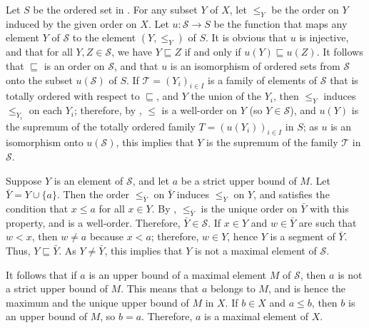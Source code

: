 \documentclass{article}
\begin{document}
\begin{solution}[\ref{exe:51daga9q}]
  \label{sol:5u09m13a}
  Let \(S\) be the ordered set in .  For any subset
  \(Y\) of \(X\), let \(\leq_Y\) be the order on \(Y\) induced by the
  given order on \(X\).  Let \(u : \mathcal{S} \to S\) be the function
  that maps any element \(Y\) of \(\mathcal{S}\) to the element
  \((Y, \leq_Y)\) of \(S\).  It is obvious that \(u\) is injective,
  and that for all \(Y, Z \in \mathcal{S}\), we have
  \(Y \sqsubseteq Z\) if and only if \(u(Y) \sqsubseteq u(Z)\).  It
  follows that \(\sqsubseteq\) is an order on \(\mathcal{S}\), and
  that \(u\) is an isomorphism of ordered sets from \(\mathcal{S}\)
  onto the subset \(u(\mathcal{S})\) of \(S\).  If
  \(\mathcal{T} = (Y_i)_{i \in I}\) is a family of elements of
  \(\mathcal{S}\) that is totally ordered with respect to
  \(\sqsubseteq\), and \(Y\) the union of the \(Y_i\), then \(\leq_Y\)
  induces \(\leq_{Y_i}\) on each \(Y_i\); therefore, by
  , \(\leq\) is a well-order on \(Y\) (so
  \(Y \in \mathcal{S}\)), and \(u(Y)\) is the supremum of the totally
  ordered family \(T = (u(Y_i))_{i \in I}\) in \(S\); as \(u\) is an
  isomorphism onto \(u(\mathcal{S})\), this implies that \(Y\) is the
  supremum of the family \(\mathcal{T}\) in \(\mathcal{S}\).

  Suppose \(Y\) is an element of \(\mathcal{S}\), and let \(a\) be a
  strict upper bound of \(M\).  Let \(\bar{Y} = Y \cup \{ a \}\).
  Then the order \(\leq_{\bar{Y}}\) on \(\bar{Y}\) induces \(\leq_Y\)
  on \(Y\), and satisfies the condition that \(x \leq a\) for all
  \(x \in Y\).  By , \(\leq_{\bar{Y}}\) is the
  unique order on \(\bar{Y}\) with this property, and is a well-order.
  Therefore, \(\bar{Y} \in \mathcal{S}\).  If \(x \in Y\) and
  \(w \in \bar{Y}\) are such that \(w < x\), then \(w \neq a\) because
  \(x < a\); therefore, \(w \in Y\), hence \(Y\) is a segment of
  \(\bar{Y}\).  Thus, \(Y \sqsubseteq \bar{Y}\).  As
  \(Y \neq \bar{Y}\), this implies that \(Y\) is not a maximal element
  of \(\mathcal{S}\).

  It follows that if \(a\) is an upper bound of a maximal element
  \(M\) of \(\mathcal{S}\), then \(a\) is not a strict upper bound of
  \(M\).  This means that \(a\) belongs to \(M\), and is hence the
  maximum and the unique upper bound of \(M\) in \(X\).  If
  \(b \in X\) and \(a \leq b\), then \(b\) is an upper bound of \(M\),
  so \(b = a\).  Therefore, \(a\) is a maximal element of \(X\).


\end{solution}
\end{document}
